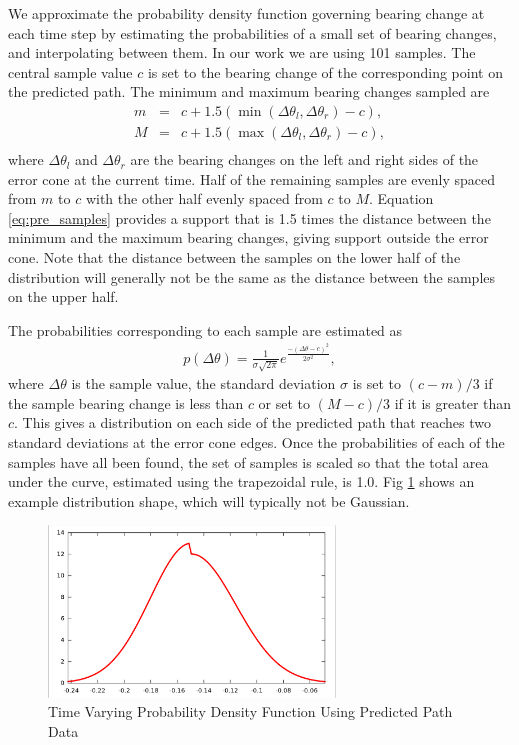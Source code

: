 \documentclass[journal]{vgtc}                %
\begin{document}
We approximate the probability density function governing bearing change at each time step by estimating
the probabilities of a small set of bearing changes, and interpolating between them. In our work we are using 101 samples.  The central sample value $c$ is set to the bearing change of the corresponding point on the predicted path.  The minimum and maximum bearing changes sampled are
\begin{equation}
 \begin{array}{lcl}
  m &=&  c + 1.5 (\min(\Delta \theta_{l}, \Delta \theta_{r}) - c), \\
  M &=&  c + 1.5 (\max(\Delta \theta_{l}, \Delta \theta_{r}) - c), \\
  \end{array}
 \label{eq:pre_samples}
\end{equation}
where $\Delta \theta_{l}$ and $\Delta \theta_{r}$ are the bearing changes on the left and right sides of the error cone at the current time.  Half of the remaining samples are evenly spaced from $m$ to $c$ with the other half evenly spaced from $c$ to $M$. Equation \ref{eq:pre_samples} provides a support that is 1.5 times the distance between the minimum and the maximum bearing changes, giving support outside the error cone.  Note that the distance between the samples on the lower half of the distribution will generally not be the same as the distance between the samples on the upper half.

The probabilities corresponding to each sample are estimated as
\[
 \begin{array}{lcl}
  p(\Delta \theta) = \frac{1}{\sigma\sqrt{2\pi}} e^{\frac{-(\Delta \theta-c)^2}{2\sigma^2}},
 \end{array}
 \label{eq:pre_weights}
\]
where $\Delta \theta$ is the sample value, the standard deviation $\sigma$ is set to $(c-m)/3$ if the sample bearing change is less 
than $c$ or set to $(M-c)/3$ if it is greater than $c$. This gives a distribution on each side of the predicted path that reaches two
standard deviations at the error cone edges. Once the probabilities of each of  the samples have all been found, the set of 
samples is scaled so that the total area under the curve, estimated using the trapezoidal rule, is 1.0.  Fig \ref{fig:ndf_pre} shows an example distribution shape, which will typically not be Gaussian.
\begin{figure}[htb]
 \centering
 \includegraphics[width=3.0in]{figures/ndf_pre.eps}
 \caption{Time Varying Probability Density Function Using Predicted Path Data}
 \label{fig:ndf_pre}
\end{figure}
\end{document}
